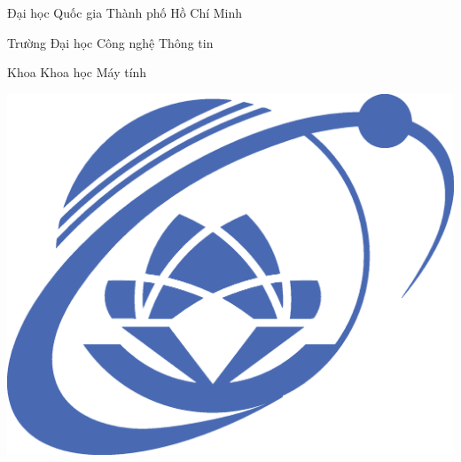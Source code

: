 \begin{titlepage}




    \setlength{\parindent}{0pt}
    \large
    \centering

    \vspace{1cm}

    Đại học Quốc gia Thành phố Hồ Chí Minh \par
    Trường Đại học Công nghệ Thông tin \par
    Khoa Khoa học Máy tính \par
    \vspace{1.2cm}

    \includegraphics[width=0.5\linewidth]{assets/uit_logo.eps}


\end{titlepage}
